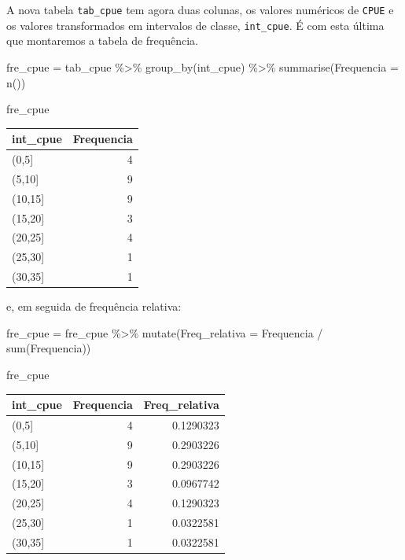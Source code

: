 \documentclass[
]{book}
\newenvironment{Shaded}{\begin{snugshade}}{\end{snugshade}}
\newcommand{\AttributeTok}[1]{\textcolor[rgb]{0.77,0.63,0.00}{#1}}
\newcommand{\FunctionTok}[1]{\textcolor[rgb]{0.00,0.00,0.00}{#1}}
\newcommand{\NormalTok}[1]{#1}
\newcommand{\OtherTok}[1]{\textcolor[rgb]{0.56,0.35,0.01}{#1}}
\newcommand{\SpecialCharTok}[1]{\textcolor[rgb]{0.00,0.00,0.00}{#1}}
\begin{document}
A nova tabela \texttt{tab\_cpue} tem agora duas colunas, os valores numéricos de \texttt{CPUE} e os valores transformados em intervalos de classe, \texttt{int\_cpue}. É com esta última que montaremos a tabela de frequência.

\begin{Shaded}
\begin{Highlighting}[]
\NormalTok{fre\_cpue }\OtherTok{=}\NormalTok{ tab\_cpue }\SpecialCharTok{\%\textgreater{}\%} 
  \FunctionTok{group\_by}\NormalTok{(int\_cpue) }\SpecialCharTok{\%\textgreater{}\%} 
  \FunctionTok{summarise}\NormalTok{(}\AttributeTok{Frequencia =} \FunctionTok{n}\NormalTok{())}

\NormalTok{fre\_cpue}
\end{Highlighting}
\end{Shaded}

\begin{tabular}{l|r}
\hline
int\_cpue & Frequencia\\
\hline
(0,5] & 4\\
\hline
(5,10] & 9\\
\hline
(10,15] & 9\\
\hline
(15,20] & 3\\
\hline
(20,25] & 4\\
\hline
(25,30] & 1\\
\hline
(30,35] & 1\\
\hline
\end{tabular}

e, em seguida de frequência relativa:

\begin{Shaded}
\begin{Highlighting}[]
\NormalTok{fre\_cpue }\OtherTok{=}\NormalTok{ fre\_cpue }\SpecialCharTok{\%\textgreater{}\%} 
  \FunctionTok{mutate}\NormalTok{(}\AttributeTok{Freq\_relativa =}\NormalTok{ Frequencia }\SpecialCharTok{/} \FunctionTok{sum}\NormalTok{(Frequencia))}

\NormalTok{fre\_cpue}
\end{Highlighting}
\end{Shaded}

\begin{tabular}{l|r|r}
\hline
int\_cpue & Frequencia & Freq\_relativa\\
\hline
(0,5] & 4 & 0.1290323\\
\hline
(5,10] & 9 & 0.2903226\\
\hline
(10,15] & 9 & 0.2903226\\
\hline
(15,20] & 3 & 0.0967742\\
\hline
(20,25] & 4 & 0.1290323\\
\hline
(25,30] & 1 & 0.0322581\\
\hline
(30,35] & 1 & 0.0322581\\
\hline
\end{tabular}
\end{document}
